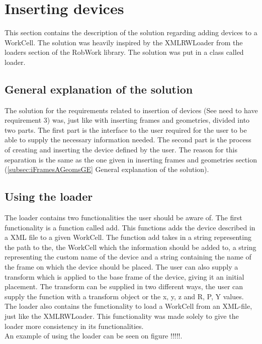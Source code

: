 \section{Inserting devices}
This section contains the description of the solution regarding adding devices to a WorkCell. The solution was heavily inspired by the XMLRWLoader from the loaders section of the RobWork library. The solution was put in a class called loader.

\subsection{General explanation of the solution}
The solution for the requirements related to insertion of devices (See need to have requirement 3) was, just like with inserting frames and geometries, divided into two parts. The first part is the interface to the user required for the user to be able to supply the necessary information needed. The second part is the process of creating and inserting the device defined by the user. The reason for this separation is the same as the one given in inserting frames and geometries section (\ref{subsec:iFramesAGeomsGE} General explanation of the solution).

\subsection{Using the loader}
The loader contains two functionalities the user should be aware of. The first functionality is a function called add. This functions adds the device described in a XML file to a given WorkCell. The function add takes in a string representing the path to the, the WorkCell which the information should be added to, a string representing the custom name of the device and a string containing the name of the frame on which the device should be placed. The user can also supply a transform which is applied to the base frame of the device, giving it an initial placement. The transform can be supplied in two different ways, the user can supply the function with a transform object or the x, y, z and R, P, Y values.\\

The loader also contains the functionality to load a WorkCell from an XML-file, just like the XMLRWLoader. This functionality was made solely to give the loader more consistency in its functionalities.\\

An example of using the loader can be seen on figure !!!!!.


